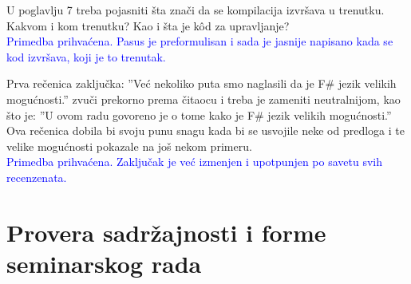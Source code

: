 \documentclass[a4paper]{report}
\newcommand{\odgovor}[1]{\textcolor{blue}{#1}}
\begin{document}
U poglavlju 7 treba pojasniti šta znači da se kompilacija izvršava u trenutku.
Kakvom i kom trenutku? Kao i šta je kôd za upravljanje?\\

\odgovor {Primedba prihvaćena. Pasus je preformulisan i sada je jasnije napisano kada se kod izvršava, koji je to trenutak. }

Prva rečenica zaključka: ''Već nekoliko puta smo naglasili da je F\# jezik velikih mogućnosti.'' zvuči prekorno prema čitaocu i treba je zameniti neutralnijom, kao što je:
''U ovom radu govoreno je o tome kako je F\# jezik velikih mogućnosti.''
Ova rečenica dobila bi svoju punu snagu kada bi se usvojile neke od predloga
i te velike mogućnosti pokazale na još nekom primeru.
\\ \odgovor {Primedba prihvaćena. Zaključak je već izmenjen i upotpunjen po savetu svih recenzenata.}
\section{Provera sadržajnosti i forme seminarskog rada}
\end{document}

